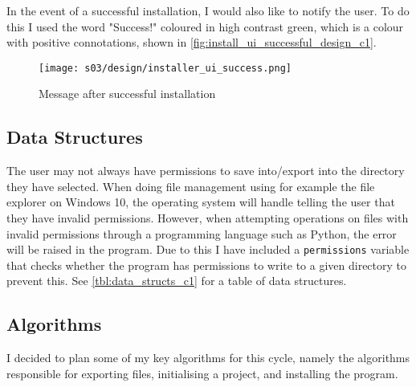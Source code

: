         In the event of a successful installation, I would also like to notify the user. To do this I used the word "Success!" coloured in high contrast green, which is a colour with positive connotations, shown in \autoref{fig:install_ui_successful_design_c1}.

        \begin{figure}[!ht]
            \centering
            \texttt{[image: s03/design/installer\_ui\_success.png]}
            \caption{Message after successful installation}
            \label{fig:install_ui_successful_design_c1}
        \end{figure}


    \subsection{Data Structures}

        The user may not always have permissions to save into/export into the directory they have selected. When doing file management using for example the file explorer on Windows 10, the operating system will handle telling the user that they have invalid permissions. However, when attempting operations on files with invalid permissions through a programming language such as Python, the error will be raised in the program. Due to this I have included a \verb|permissions| variable that checks whether the program has permissions to write to a given directory to prevent this. See \autoref{tbl:data_structs_c1} for a table of data structures.

    \subsection{Algorithms}
        I decided to plan some of my key algorithms for this cycle, namely the algorithms responsible for exporting files, initialising a project, and installing the program.

